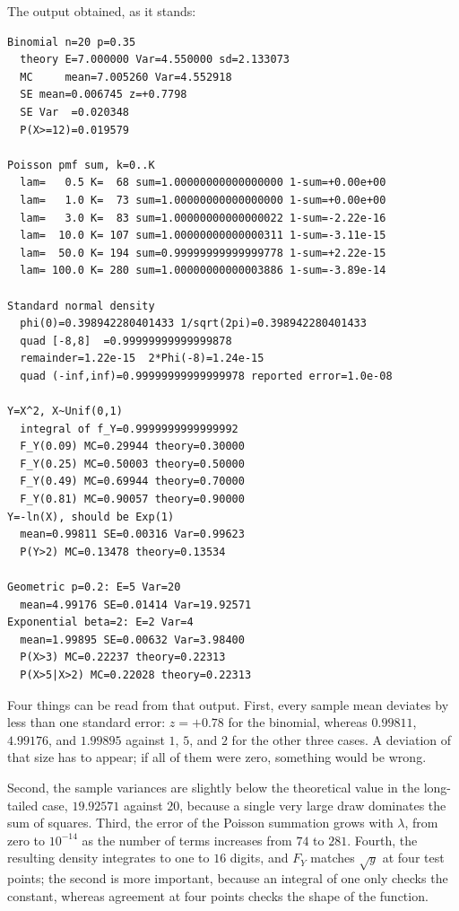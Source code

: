 The output obtained, as it stands:

\begin{verbatim}
Binomial n=20 p=0.35
  theory E=7.000000 Var=4.550000 sd=2.133073
  MC     mean=7.005260 Var=4.552918
  SE mean=0.006745 z=+0.7798
  SE Var  =0.020348
  P(X>=12)=0.019579

Poisson pmf sum, k=0..K
  lam=   0.5 K=  68 sum=1.00000000000000000 1-sum=+0.00e+00
  lam=   1.0 K=  73 sum=1.00000000000000000 1-sum=+0.00e+00
  lam=   3.0 K=  83 sum=1.00000000000000022 1-sum=-2.22e-16
  lam=  10.0 K= 107 sum=1.00000000000000311 1-sum=-3.11e-15
  lam=  50.0 K= 194 sum=0.99999999999999778 1-sum=+2.22e-15
  lam= 100.0 K= 280 sum=1.00000000000003886 1-sum=-3.89e-14

Standard normal density
  phi(0)=0.398942280401433 1/sqrt(2pi)=0.398942280401433
  quad [-8,8]  =0.99999999999999878
  remainder=1.22e-15  2*Phi(-8)=1.24e-15
  quad (-inf,inf)=0.99999999999999978 reported error=1.0e-08

Y=X^2, X~Unif(0,1)
  integral of f_Y=0.9999999999999992
  F_Y(0.09) MC=0.29944 theory=0.30000
  F_Y(0.25) MC=0.50003 theory=0.50000
  F_Y(0.49) MC=0.69944 theory=0.70000
  F_Y(0.81) MC=0.90057 theory=0.90000
Y=-ln(X), should be Exp(1)
  mean=0.99811 SE=0.00316 Var=0.99623
  P(Y>2) MC=0.13478 theory=0.13534

Geometric p=0.2: E=5 Var=20
  mean=4.99176 SE=0.01414 Var=19.92571
Exponential beta=2: E=2 Var=4
  mean=1.99895 SE=0.00632 Var=3.98400
  P(X>3) MC=0.22237 theory=0.22313
  P(X>5|X>2) MC=0.22028 theory=0.22313
\end{verbatim}

Four things can be read from that output. First, every sample mean deviates by less
than one standard error: $z=+0.78$ for the binomial, whereas $0.99811$, $4.99176$,
and $1.99895$ against $1$, $5$, and $2$ for the other three cases. A deviation
of that size has to appear; if all of them were zero, something would be wrong.

Second, the sample variances are slightly below the theoretical value in the long-tailed case,
$19.92571$ against $20$, because a single very large draw dominates the sum
of squares. Third, the error of the Poisson summation grows with $\lambda$, from zero to
$10^{-14}$ as the number of terms increases from $74$ to $281$. Fourth, the resulting
density integrates to one to $16$ digits, and $F_Y$ matches $\sqrt y$ at four test
points; the second is more important, because an integral of one only checks the constant,
whereas agreement at four points checks the shape of the function.

